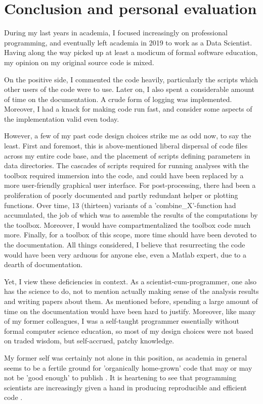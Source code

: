 \section{Conclusion and personal evaluation}
During my last years in academia, I focused increasingly on professional programming, and eventually left academia in 2019 to work as a Data Scientist. Having along the way picked up at least a modicum of formal software education, my opinion on my original source code is mixed. 

On the positive side, I commented the code heavily, particularly the scripts which other users of the code were to use. Later on, I also spent a considerable amount of time on the documentation. A crude form of logging was implemented. Moreover, I had a knack for making code run fast, and consider some aspects of the implementation valid even today.

However, a few of my past code design choices strike me as odd now, to say the least. First and foremost, this is above-mentioned liberal dispersal of code files across my entire code base, and the placement of scripts defining parameters in data directories. The cascades of scripts required for running analyses with the toolbox required immersion into the code, and could have been replaced by a more user-friendly graphical user interface. For post-processing, there had been a proliferation of poorly documented and partly redundant helper or plotting functions. Over time, 13 (thirteen) variants of a 'combine\_X'-function had accumulated, the job of which was to assemble the results of the computations by the toolbox. Moreover, I would have compartmentalized the toolbox code much more. Finally, for a toolbox of this scope, more time should have been devoted to the documentation. All things considered, I believe that resurrecting the code would have been very arduous for anyone else, even a Matlab expert, due to a dearth of documentation.

Yet, I view these deficiencies in context. As a scientist-cum-programmer, one also has the science to do, not to mention actually making sense of the analysis results and writing papers about them. As mentioned before, spending a large amount of time on the documentation would have been hard to justify. Moreover, like many of my former colleagues, I was a self-taught programmer essentially without formal computer science education, so most of my design choices were not based on traded wisdom, but self-accrued, patchy knowledge. 

My former self was certainly not alone in this position, as academia in general seems to be a fertile ground for 'organically home-grown' code that may or may not be 'good enough' to publish \cite{barnes_publish_2010}. It is heartening to see that programming scientists are increasingly given a hand in producing reproducible and efficient code \cite{wilson_good_2017}.

